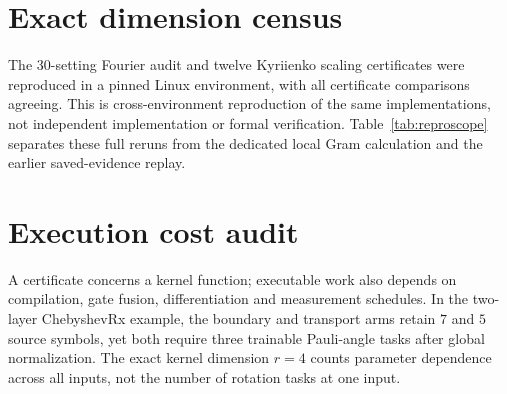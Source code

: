 \documentclass[a4paper,twocolumn,11pt,unpublished]{quantumarticle}
\begin{document}






\section{Exact dimension census}
\label{sec:census}



The 30-setting Fourier audit and twelve Kyriienko scaling
certificates were reproduced in a pinned Linux environment, with all
certificate comparisons agreeing. This is cross-environment
reproduction of the same implementations, not independent
implementation or formal verification. Table~\ref{tab:reproscope}
separates these full reruns from the dedicated local Gram calculation
and the earlier saved-evidence replay.



\section{Execution cost audit}
\label{sec:cost}
A certificate concerns a kernel function; executable work also depends
on compilation, gate fusion, differentiation and measurement schedules.
In the two-layer ChebyshevRx example, the boundary and transport arms
retain $7$ and $5$ source symbols, yet both require three trainable
Pauli-angle tasks after global normalization. The exact kernel
dimension $r=4$ counts parameter dependence across all inputs, not the
number of rotation tasks at one input.


\end{document}
